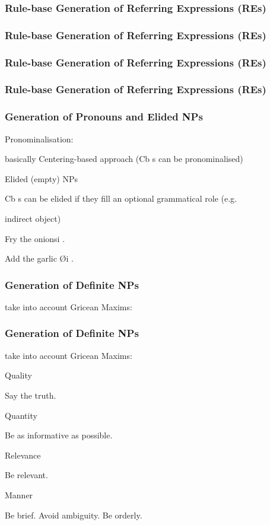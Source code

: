\documentclass[compress,color=usenames]{beamer}
\begin{document}
\begin{frame}
\frametitle{Rule-base Generation of Referring Expressions (REs)}

\end{frame}

\begin{frame}
\frametitle{Rule-base Generation of Referring Expressions (REs)}

\end{frame}

\begin{frame}
\frametitle{Rule-base Generation of Referring Expressions (REs)}

\end{frame}

\begin{frame}
\frametitle{Rule-base Generation of Referring Expressions (REs)}

\end{frame}

\begin{frame}
\frametitle{Generation of Pronouns and Elided NPs}

Pronominalisation:

basically Centering-based approach (Cb s can be pronominalised)

Elided (empty) NPs

Cb s can be elided if they ﬁll an optional grammatical role (e.g.

indirect object)

Fry the onionsi .

Add the garlic {\O}i .

\end{frame}

\begin{frame}
\frametitle{Generation of Deﬁnite NPs}

take into account Gricean Maxims:

\end{frame}

\begin{frame}
\frametitle{Generation of Deﬁnite NPs}

take into account Gricean Maxims:

Quality

Say the truth.

Quantity

Be as informative as possible.

Relevance

Be relevant.

Manner

Be brief. Avoid ambiguity. Be orderly.

\end{frame}
\end{document}
